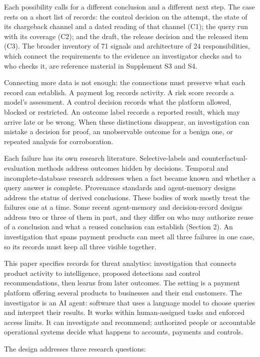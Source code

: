 \documentclass[acmlarge,nonacm]{acmart}
\begin{document}
Each possibility calls for a different conclusion and a different next
step. The case rests on a short list of records: the control decision on
the attempt, the state of its chargeback channel and a dated reading of
that channel (C1); the query run with its coverage (C2); and the draft,
the release decision and the released item (C3). The broader inventory
of 71 signals and architecture of 24 responsibilities, which connect the
requirements to the evidence an investigator checks and to who checks
it, are reference material in Supplement S3 and S4.

Connecting more data is not enough: the connections must preserve what
each record can establish. A payment log records activity. A risk score
records a model's assessment. A control decision records what the
platform allowed, blocked or restricted. An outcome label records a
reported result, which may arrive late or be wrong. When these
distinctions disappear, an investigation can mistake a decision for
proof, an unobservable outcome for a benign one, or repeated analysis
for corroboration.

Each failure has its own research literature. Selective-labels and
counterfactual-evaluation methods address outcomes hidden by decisions.
Temporal and incomplete-database research addresses when a fact became
known and whether a query answer is complete. Provenance standards and
agent-memory designs address the status of derived conclusions. These
bodies of work mostly treat the failures one at a time. Some recent
agent-memory and decision-record designs address two or three of them in
part, and they differ on who may authorize reuse of a conclusion and
what a reused conclusion can establish (Section 2). An investigation
that spans payment products can meet all three failures in one case, so
its records must keep all three visible together.

This paper specifies records for threat analytics: investigation that
connects product activity to intelligence, proposed detections and
control recommendations, then learns from later outcomes. The setting is
a payment platform offering several products to businesses and their end
customers. The investigator is an AI agent: software that uses a
language model to choose queries and interpret their results. It works
within human-assigned tasks and enforced access limits. It can
investigate and recommend; authorized people or accountable operational
systems decide what happens to accounts, payments and controls.

The design addresses three research questions:
\end{document}
